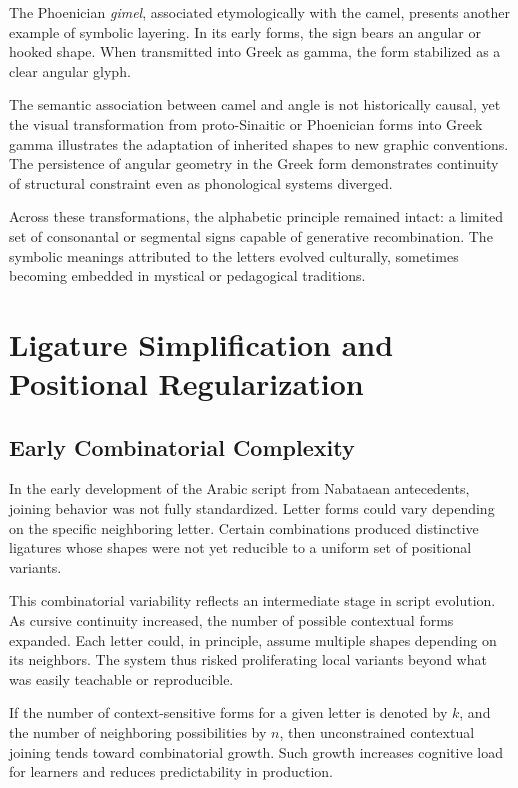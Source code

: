 \documentclass[11pt]{article}
\begin{document}
The Phoenician \textit{gimel}, associated etymologically with the camel, presents another example of symbolic layering. In its early forms, the sign bears an angular or hooked shape. When transmitted into Greek as gamma, the form stabilized as a clear angular glyph.

The semantic association between camel and angle is not historically causal, yet the visual transformation from proto-Sinaitic or Phoenician forms into Greek gamma illustrates the adaptation of inherited shapes to new graphic conventions. The persistence of angular geometry in the Greek form demonstrates continuity of structural constraint even as phonological systems diverged.

Across these transformations, the alphabetic principle remained intact: a limited set of consonantal or segmental signs capable of generative recombination. The symbolic meanings attributed to the letters evolved culturally, sometimes becoming embedded in mystical or pedagogical traditions.

\section{Ligature Simplification and Positional Regularization}

\subsection{Early Combinatorial Complexity}

In the early development of the Arabic script from Nabataean antecedents, joining behavior was not fully standardized. Letter forms could vary depending on the specific neighboring letter. Certain combinations produced distinctive ligatures whose shapes were not yet reducible to a uniform set of positional variants.

This combinatorial variability reflects an intermediate stage in script evolution. As cursive continuity increased, the number of possible contextual forms expanded. Each letter could, in principle, assume multiple shapes depending on its neighbors. The system thus risked proliferating local variants beyond what was easily teachable or reproducible.

If the number of context-sensitive forms for a given letter is denoted by $k$, and the number of neighboring possibilities by $n$, then unconstrained contextual joining tends toward combinatorial growth. Such growth increases cognitive load for learners and reduces predictability in production.
\end{document}
